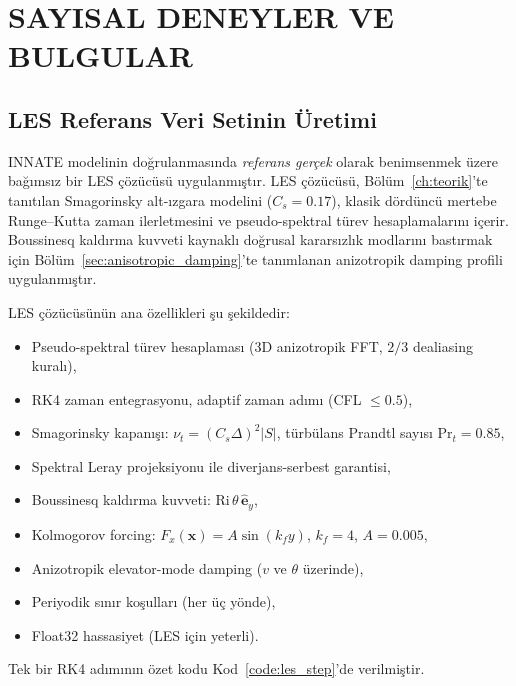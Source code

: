 \chapter{SAYISAL DENEYLER VE BULGULAR}
\label{ch:bulgular}

\section{LES Referans Veri Setinin Üretimi}
\label{sec:les_referans}

INNATE modelinin doğrulanmasında \emph{referans gerçek} olarak benimsenmek üzere bağımsız bir LES çözücüsü uygulanmıştır. LES çözücüsü, Bölüm~\ref{ch:teorik}'te tanıtılan Smagorinsky alt-ızgara modelini ($C_{s}=0.17$), klasik dördüncü mertebe Runge--Kutta zaman ilerletmesini ve pseudo-spektral türev hesaplamalarını içerir. Boussinesq kaldırma kuvveti kaynaklı doğrusal kararsızlık modlarını bastırmak için Bölüm~\ref{sec:anisotropic_damping}'te tanımlanan anizotropik damping profili uygulanmıştır.

LES çözücüsünün ana özellikleri şu şekildedir:
\begin{itemize}
  \item Pseudo-spektral türev hesaplaması (3D anizotropik FFT, $2/3$ dealiasing kuralı),
  \item RK4 zaman entegrasyonu, adaptif zaman adımı (CFL $\leq 0.5$),
  \item Smagorinsky kapanışı: $\nu_{t} = (C_{s}\Delta)^{2}|S|$, türbülans Prandtl sayısı $\mathrm{Pr}_{t}=0.85$,
  \item Spektral Leray projeksiyonu ile diverjans-serbest garantisi,
  \item Boussinesq kaldırma kuvveti: $\mathrm{Ri}\,\theta\,\hat{\mathbf{e}}_{y}$,
  \item Kolmogorov forcing: $F_{x}(\mathbf{x}) = A\sin(k_{f}y)$, $k_{f}=4$, $A=0.005$,
  \item Anizotropik elevator-mode damping ($v$ ve $\theta$ üzerinde),
  \item Periyodik sınır koşulları (her üç yönde),
  \item Float32 hassasiyet (LES için yeterli).
\end{itemize}
Tek bir RK4 adımının özet kodu Kod~\ref{code:les_step}'de verilmiştir.

